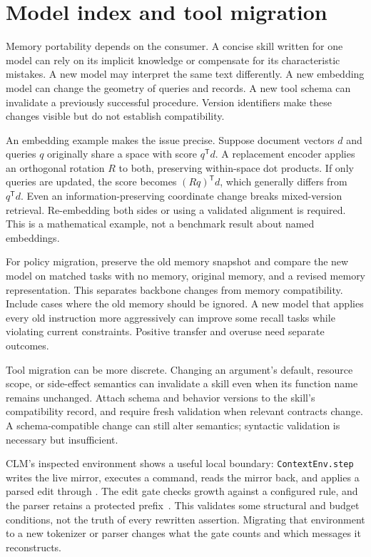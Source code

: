 \section{Model index and tool migration}\label{sec:C17:migration}
Memory portability depends on the consumer. A concise skill written for one model can rely on its implicit knowledge or compensate for its characteristic mistakes. A new model may interpret the same text differently. A new embedding model can change the geometry of queries and records. A new tool schema can invalidate a previously successful procedure. Version identifiers make these changes visible but do not establish compatibility.

An embedding example makes the issue precise. Suppose document vectors $d$ and queries $q$ originally share a space with score $q^{\mathsf T}d$. A replacement encoder applies an orthogonal rotation $R$ to both, preserving within-space dot products. If only queries are updated, the score becomes $(Rq)^{\mathsf T}d$, which generally differs from $q^{\mathsf T}d$. Even an information-preserving coordinate change breaks mixed-version retrieval. Re-embedding both sides or using a validated alignment is required. This is a mathematical example, not a benchmark result about named embeddings.

For policy migration, preserve the old memory snapshot and compare the new model on matched tasks with no memory, original memory, and a revised memory representation. This separates backbone changes from memory compatibility. Include cases where the old memory should be ignored. A new model that applies every old instruction more aggressively can improve some recall tasks while violating current constraints. Positive transfer and overuse need separate outcomes.

Tool migration can be more discrete. Changing an argument's default, resource scope, or side-effect semantics can invalidate a skill even when its function name remains unchanged. Attach schema and behavior versions to the skill's compatibility record, and require fresh validation when relevant contracts change. A schema-compatible change can still alter semantics; syntactic validation is necessary but insufficient.

CLM's inspected environment shows a useful local boundary: \texttt{ContextEnv.step} writes the live mirror, executes a command, reads the mirror back, and applies a parsed edit through . The edit gate checks growth against a configured rule, and the parser retains a protected prefix~\cite{repo_clm2026}. This validates some structural and budget conditions, not the truth of every rewritten assertion. Migrating that environment to a new tokenizer or parser changes what the gate counts and which messages it reconstructs.

